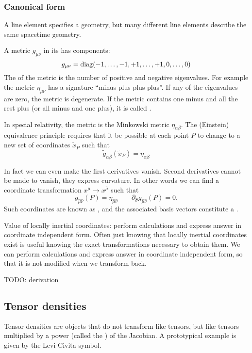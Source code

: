 \subsubsection{Canonical form}
A line element specifies a geometry, but many different line elements describe the same spacetime geometry.

A metric $g_{\mu\nu}$ in its  has components:
\[ g_{\mu\nu} = \operatorname{diag}(-1,\ldots,-1,+1,\ldots,+1,0,\ldots,0) \]
The  of the metric is the number of positive and negative eigenvalues. For example the metric $\eta_{\mu\nu}$ has a signature ``minus-plus-plus-plus''. If any of the eigenvalues are zero, the metric is degenerate. If the metric contains one minus and all the rest plus (or all minus and one plus), it is called .


In special relativity, the metric is the Minkowski metric $\eta_{\alpha\beta}$. The (Einstein) equivalence principle requires that it be possible at each point $P$ to change to a new set of coordinates $\tilde{x}_P$ such that
\[ \tilde{g}_{\alpha\beta}(\tilde{x}_P) = \eta_{\alpha\beta} \]

In fact we can even make the first derivatives vanish. Second derivatives cannot be made to vanish, they express curvature. In other words we can find a coordinate transformation $x^\mu \to x^{\hat{\mu}}$ such that
\[g_{\hat{\mu}\hat{\nu}}(P) = \eta_{\hat{\mu}\hat{\nu}} \qquad \partial_{\hat{\sigma}}g_{\hat{\mu}\hat{\nu}}(P) = 0.\]
Such coordinates are known as , and the associated basis vectors constitute a . 

Value of locally inertial coordinates: perform calculations and express answer in coordinate independent form. Often just knowing that locally inertial coordinates exist is useful knowing the exact transformations necessary to obtain them. We can perform calculations and express answer in coordinate independent form, so that it is not modified when we transform back.

\begin{note}
TODO: derivation
\end{note}

\subsection{Tensor densities}
Tensor densities are objects that do not transform like tensors, but like tensors multiplied by a power (called the ) of the Jacobian. A prototypical example is given by the Levi-Civita symbol.

